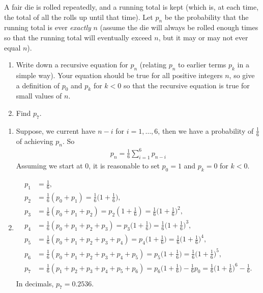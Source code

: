 

\setcounter{theorem}{19}

\begin{exercise}[BH.2.48]
  A fair die is rolled repeatedly, and a running total is kept (which is, at each time, the total of all the rolls up until that time). Let $p_n$ be the probability that the running total is ever \emph{exactly} $n$ (assume the die will always be rolled enough times so that the running total will eventually exceed $n$, but it may or may not ever equal $n$).
	\begin{enumerate}
		\item  Write down a recursive equation for $p_n$ (relating $p_n$ to earlier terms $p_k$ in a simple way). Your equation should be true for all positive integers $n$, so give a definition of $p_0$ and $p_k$ for $k < 0$ so that the recursive equation is true for small values of $n$.
		\item Find $p_7$.
	\end{enumerate}
\begin{solution}
	\begin{enumerate}
		\item Suppose, we current have $n-i$ for $i=1,\ldots,6$, then we have a probability of $\frac{1}{6}$ of achieving $p_{n}$. So
		\begin{align*}
			p_{n} = \frac{1}{6}\sum_{i=1}^{6}p_{n-i}
		\end{align*}
		Assuming we start at 0, it is reasonable to set $p_{0}=1$ and $p_{k}=0$ for $k<0$. 
		\item
		\begin{align*}
			p_{1} &= \frac{1}{6},\\
			p_{2} &= \frac{1}{6}(p_{0}+p_{1}) =\frac{1}{6}\bigg(1+\frac{1}{6}\bigg),\\
			p_{3} &= \frac{1}{6}(p_{0}+p_{1}+p_{2}) = p_{2}(1+\frac{1}{6})=\frac{1}{6}\bigg(1+\frac{1}{6}\bigg)^2,\\
			p_{4} & = \frac{1}{6}(p_{0}+p_{1}+p_{2}+p_{3})=p_{3}\bigg(1+\frac{1}{6}\bigg) = \frac{1}{6}\bigg(1+\frac{1}{6}\bigg)^3,\\
			p_{5} & = \frac{1}{6}(p_{0}+p_{1}+p_{2}+p_{3} + p_{4})=p_{4}\bigg(1+\frac{1}{6}\bigg) = \frac{1}{6}\bigg(1+\frac{1}{6}\bigg)^4,\\
			p_{6} & = \frac{1}{6}(p_{0}+p_{1}+p_{2}+p_{3}+p_{4}+p_{5})=p_{5}\bigg(1+\frac{1}{6}\bigg) = \frac{1}{6}\bigg(1+\frac{1}{6}\bigg)^5,\\
			p_{7} & = \frac{1}{6}(p_{1}+p_{2}+p_{3}+p_{4}+p_{5}+p_{6})=p_{6}\bigg(1+\frac{1}{6}\bigg)-\frac{1}{6}p_{0}  = \frac{1}{6}\bigg(1+\frac{1}{6}\bigg)^6-\frac{1}{6}.\\	
		\end{align*}
		In decimals, $p_{7}=0.2536$.
	\end{enumerate}
\end{solution}
\end{exercise}

